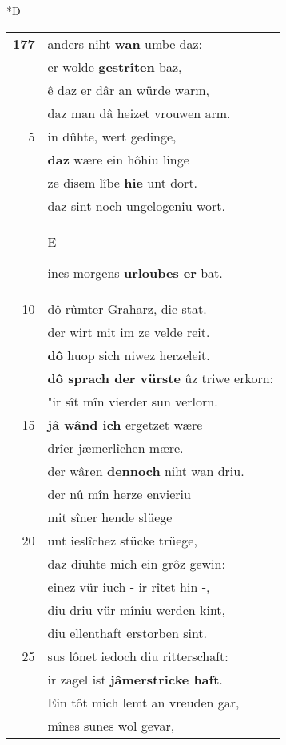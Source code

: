 \documentclass[8pt,a4paper,notitlepage]{article}
\begin{document}
\begin{table}[ht]
\begin{minipage}[t]{0.5\linewidth}
\small
\begin{center}*D
\end{center}
\begin{tabular}{rl}
\textbf{177} & anders niht \textbf{wan} umbe daz:\\ 
 & er wolde \textbf{gestrîten} baz,\\ 
 & ê daz er dâr an würde warm,\\ 
 & daz man dâ heizet vrouwen arm.\\ 
5 & in dûhte, wert gedinge,\\ 
 & \textbf{daz} wære ein hôhiu linge\\ 
 & ze disem lîbe \textbf{hie} unt dort.\\ 
 & daz sint noch ungelogeniu wort.\\ 
 & \begin{large}E\end{large}ines morgens \textbf{urloubes er} bat.\\ 
10 & dô rûmter Graharz, die stat.\\ 
 & der wirt mit im ze velde reit.\\ 
 & \textbf{dô} huop sich niwez herzeleit.\\ 
 & \textbf{dô sprach der vürste} ûz triwe erkorn:\\ 
 & "ir sît mîn vierder sun verlorn.\\ 
15 & \textbf{jâ wând ich} ergetzet wære\\ 
 & drîer jæmerlîchen mære.\\ 
 & der wâren \textbf{dennoch} niht wan driu.\\ 
 & der nû mîn herze envieriu\\ 
 & mit sîner hende slüege\\ 
20 & unt ieslîchez stücke trüege,\\ 
 & daz diuhte mich ein grôz gewin:\\ 
 & einez vür iuch - ir rîtet hin -,\\ 
 & diu driu vür mîniu werden kint,\\ 
 & diu ellenthaft erstorben sint.\\ 
25 & sus lônet iedoch diu ritterschaft:\\ 
 & ir zagel ist \textbf{jâmerstricke haft}.\\ 
 & Ein tôt mich lemt an vreuden gar,\\ 
 & mînes sunes wol gevar,\\ 

\end{tabular}
\end{minipage}
\end{table}
\end{document}
